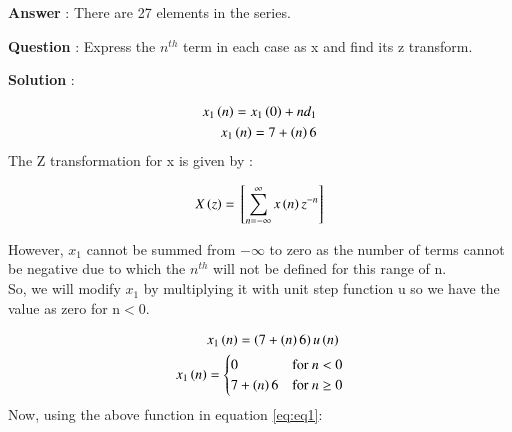 \documentclass[journal,12pt,twocolumn]{IEEEtran}
\theoremstyle{remark}
\begin{document}
\large\textbf{Answer} : \normalsize There are 27 elements in the series.

\vspace{4mm}

\large\textbf{Question} : \normalsize Express the $n^{th}$ term in each case as x and find its z transform.

\vspace{4mm}

\large\textbf{Solution} : \normalsize

\textbf{} 
\begin{align}
x_{1}\left(n\right) = x_{1}\left(0\right) + nd_{1}\\
x_{1}\left(n\right) = 7 + \left(n\right)6
\end{align}
The Z transformation for x is given by :

\begin{align}  \label{eq:eq1}
    X\left(z\right) ={}\left[\sum_{n=-\infty}^{\infty}x\left(n\right)z^{-n}\right]
\end{align}

However, $x_{1}$ cannot be summed from $-\infty$ to zero as the number of terms cannot be negative due to which the $n^{th}$ will not be defined for this range of n.\\
So, we will modify $x_{1}$ by multiplying it with unit step function u so we have the value as zero for n$<$0.

\begin{align}
&x_{1}\left(n\right) = \left(7 + \left(n\right)6\right)u\left(n\right) \label{eq:eq10} \\
     x_{1}\left(n\right) & = \begin{cases} 
        0 & \text{for } n < 0 \\
        7 + \left(n\right)6 & \text{for } n \geq 0
    \end{cases}
\end{align}
Now, using the above function in equation \eqref{eq:eq1}: 
\end{document}
